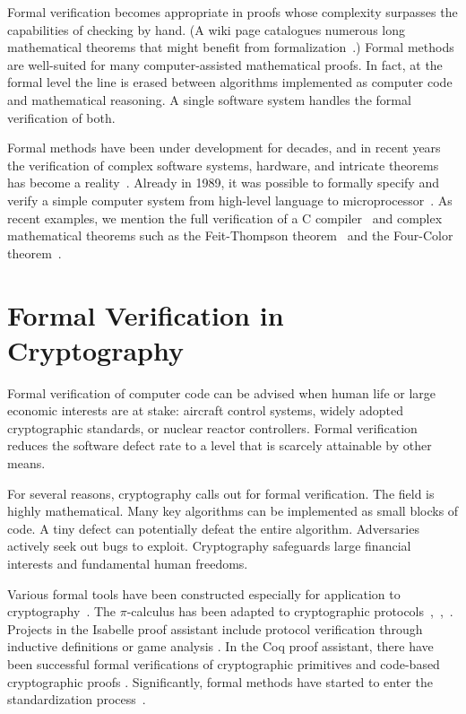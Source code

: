 \documentclass[11pt]{amsart} %
\begin{document}
Formal verification becomes appropriate in proofs whose complexity surpasses the capabilities of checking by hand.
(A wiki page catalogues numerous long mathematical theorems that might benefit
from formalization~\cite{WikiLong}.)  
Formal methods are well-suited for many computer-assisted mathematical proofs.  
In fact, at the formal level the line is erased between algorithms implemented as computer code
and mathematical reasoning.  A single software system
 handles  the formal verification of both.  

Formal methods have been under development for decades, and in recent years the verification
of complex software systems, hardware, and intricate theorems has become a reality~\cite{FVI}.  
Already in 1989, it was possible to formally specify and verify a simple computer system from high-level language
to microprocessor~\cite{BHMY}.  As recent examples, 
we mention the full
verification of a C compiler~\cite{CC-Web}
and complex mathematical theorems such as the Feit-Thompson theorem~\cite{OOT-13} and the Four-Color theorem~\cite{gonthier:2008:formal}.


\section{Formal Verification in Cryptography}

Formal verification of computer code can be advised when
human life or large economic interests are at stake:   
aircraft control systems, widely adopted cryptographic standards, or nuclear reactor controllers.
Formal verification reduces the software defect rate to a level that is
scarcely attainable by other means.

For several reasons,  cryptography calls out for formal verification.
The field is highly mathematical.  Many key algorithms can be implemented as
small blocks of code.  A tiny defect can potentially defeat the entire algorithm.
Adversaries actively seek out bugs to exploit.
Cryptography safeguards
large financial interests and fundamental human freedoms.

Various formal tools have been constructed especially for application to cryptography~\cite{MPRI-Notes}.
The $\pi$-calculus 
has been adapted to cryptographic protocols~\cite{AF},~\cite{SPI},~\cite{RM99}.
Projects in the Isabelle proof assistant
include protocol verification through inductive definitions \cite{Pau-ind} or game analysis \cite{Berg-thesis}. In the Coq proof assistant,
there have been successful 
formal verifications of cryptographic primitives \cite{Nowak} and code-based cryptographic proofs \cite{Barthe-2009}.
Significantly, formal methods have started to enter the standardization process~\cite{Meadows}.
\end{document}
